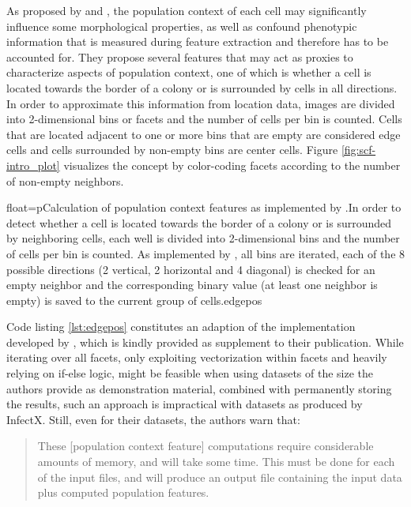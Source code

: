 \label{ex:efficiency}
As proposed by \cite{Knapp2011} and \cite{Snijder2012}, the population context of each cell may significantly influence some morphological properties, as well as confound phenotypic information that is measured during feature extraction and therefore has to be accounted for. They propose several features that may act as proxies to characterize aspects of population context, one of which is whether a cell is located towards the border of a colony or is surrounded by cells in all directions. In order to approximate this information from location data, images are divided into 2-dimensional bins or facets and the number of cells per bin is counted. Cells that are located adjacent to one or more bins that are empty are considered edge cells and cells surrounded by non-empty bins are center cells. Figure \ref{fig:scf-intro_plot} visualizes the concept by color-coding facets according to the number of non-empty neighbors.

\begin{rlisting}{float=p}{Calculation of population context features as implemented by \citeauthor{Knapp2011}.}{In order to detect whether a cell is located towards the border of a colony or is surrounded by neighboring cells, each well is divided into 2-dimensional bins and the number of cells per bin is counted. As implemented by \citeauthor{Knapp2011}, all bins are iterated, each of the 8 possible directions (2 vertical, 2 horizontal and 4 diagonal) is checked for an empty neighbor and the corresponding binary value (at least one neighbor is empty) is saved to the current group of cells.}{edgepos}

\end{rlisting}

Code listing \ref{lst:edgepos} constitutes an adaption of the implementation developed by \citeauthor{Knapp2011}, which is kindly provided as supplement to their publication. While iterating over all facets, only exploiting vectorization within facets and heavily relying on if-else logic, might be feasible when using datasets of the size the authors provide as demonstration material, combined with permanently storing the results, such an approach is impractical with datasets as produced by InfectX. Still, even for their datasets, the authors warn that:

\begin{quote}
These [population context feature] computations require considerable amounts of memory, and will take some time. This must be done for each of the input files, and will produce an output file containing the input data plus computed population features.
\end{quote}

